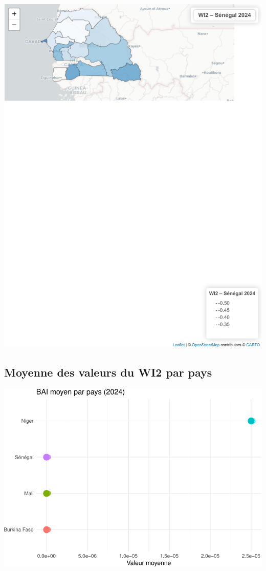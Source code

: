 \documentclass[
]{book}
\begin{document}
\includegraphics{Atlas-Spectral-Sahel_files/figure-latex/wi2-carte-1.pdf}

\subsection{Moyenne des valeurs du WI2 par pays}\label{moyenne-des-valeurs-du-wi2-par-pays}

\includegraphics{Atlas-Spectral-Sahel_files/figure-latex/wi2-plot-1.pdf}
\end{document}
